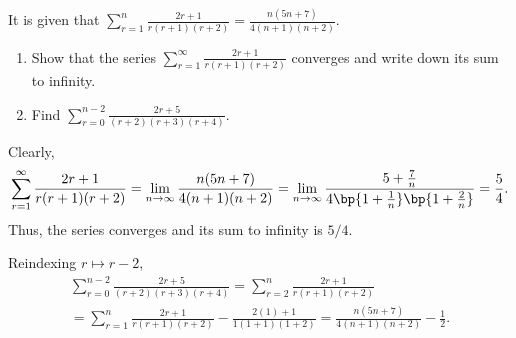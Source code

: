 \clearpage
\begin{problem}
    It is given that $\sum_{r = 1}^n \frac{2r+1}{r(r+1)(r+2)} = \frac{n(5n+7)}{4(n+1)(n+2)}$.
    \begin{enumerate}
        \item Show that the series $\sum_{r = 1}^\infty \frac{2r+1}{r(r+1)(r+2)}$ converges and write down its sum to infinity.
        \item Find $\sum_{r = 0}^{n-2} \frac{2r+5}{(r+2)(r+3)(r+4)}$.
    \end{enumerate}
\end{problem}
\begin{solution}
    \begin{ppart}
        Clearly, \[\sum_{r = 1}^\infty \frac{2r+1}{r(r+1)(r+2)} = \lim_{n \to \infty} \frac{n(5n+7)}{4(n+1)(n+2)} = \lim_{n \to \infty} \frac{5 + \frac7n}{4 \bp{1 + \frac1n} \bp{1 + \frac2n}} = \frac54.\] Thus, the series converges and its sum to infinity is $5/4$.
    \end{ppart}
    \begin{ppart}
        Reindexing $r \mapsto r - 2$,
        \begin{gather*}
            \sum_{r = 0}^{n-2} \frac{2r+5}{(r+2)(r+3)(r+4)} = \sum_{r = 2}^n \frac{2r+1}{r(r+1)(r+2)} \\
            = \sum_{r = 1}^n \frac{2r+1}{r(r+1)(r+2)} - \frac{2(1) + 1}{1 (1 + 1) (1 + 2)} = \frac{n(5n+7)}{4(n+1)(n+2)} - \frac12.
        \end{gather*}
    \end{ppart}
\end{solution}
